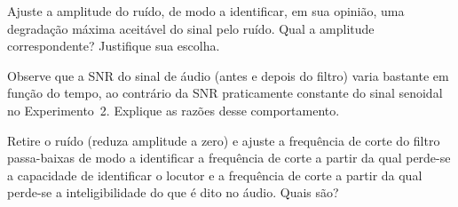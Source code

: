 \documentclass[12pt,addpoints]{exam}
\begin{document}
\begin{questions}
    \question Ajuste a amplitude do ruído, de modo a identificar, em sua opinião, uma degradação máxima aceitável do sinal pelo ruído. Qual a amplitude correspondente? Justifique sua escolha.
    \fillwithlines{1.0in}
    
    \question Observe que a SNR do sinal de áudio (antes e depois do filtro) varia bastante em função do tempo, ao contrário da SNR praticamente constante do sinal senoidal no Experimento~2. Explique as razões desse comportamento.
    \fillwithlines{1.0in}
    
    \question Retire o ruído (reduza amplitude a zero) e ajuste a frequência de corte do filtro passa-baixas de modo a identificar a frequência de corte a partir da qual perde-se a capacidade de identificar o locutor e a frequência de corte a partir da qual perde-se a inteligibilidade do que é dito no áudio. Quais são?
    \fillwithlines{0.5in}
\end{questions}
\end{document}

